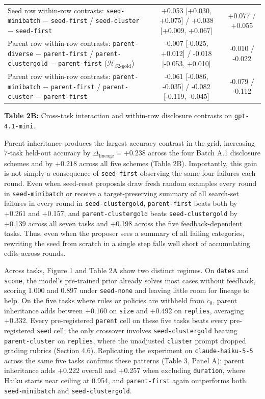 \documentclass[10pt]{article}
\begin{document}
\begin{center}
{\begin{tabular}{@{}>{\raggedright\arraybackslash}p{8.8cm}cc@{}}
Seed row within-row contrasts: \texttt{seed-minibatch} \(-\) \texttt{seed-first} / \texttt{seed-cluster} \(-\) \texttt{seed-first} & +0.053 {[}+0.030, +0.075{]} / +0.038 {[}+0.009, +0.067{]} & +0.077 / +0.055 \\
Parent row within-row contrasts: \texttt{parent-diverse} \(-\) \texttt{parent-first} / \texttt{parent-clustergold} \(-\) \texttt{parent-first} (\(\mathcal{H}_{S2\text{-gold}}\)) & -0.007 {[}-0.025, +0.012{]} / -0.018 {[}-0.053, +0.010{]} & -0.010 / -0.022 \\
Parent row within-row contrasts: \texttt{parent-minibatch} \(-\) \texttt{parent-first} / \texttt{parent-cluster} \(-\) \texttt{parent-first} & -0.061 {[}-0.086, -0.035{]} / -0.082 {[}-0.119, -0.045{]} & -0.079 / -0.112 \\
\bottomrule
\end{tabular}%
}
\end{center}

\textbf{Table 2B:} Cross-task interaction and within-row disclosure
contrasts on \texttt{gpt-4.1-mini}.

Parent inheritance produces the largest accuracy contrast in the grid,
increasing 7-task held-out accuracy by
\(\Delta_{\text{lineage}} = +0.238\) across the four Batch A.1
disclosure schemes and by \(+0.218\) across all five schemes (Table 2B).
Importantly, this gain is not simply a consequence of
\texttt{seed-first} observing the same four failures each round. Even
when seed-reset proposals draw fresh random examples every round in
\texttt{seed-minibatch} or receive a target-preserving summary of all
search-set failures in every round in \texttt{seed-clustergold},
\texttt{parent-first} beats both by +0.261 and +0.157, and
\texttt{parent-clustergold} beats \texttt{seed-clustergold} by +0.139
across all seven tasks and +0.198 across the five feedback-dependent
tasks. Thus, even when the proposer sees a summary of all failing
categories, rewriting the seed from scratch in a single step falls well
short of accumulating edits across rounds.

Across tasks, Figure 1 and Table 2A show two distinct regimes. On
\texttt{dates} and \texttt{scone}, the model's pre-trained prior already
solves most cases without feedback, scoring 1.000 and 0.897 under
\texttt{seed-none} and leaving little room for lineage to help. On the
five tasks where rules or policies are withheld from \(c_0\), parent
inheritance adds between +0.160 on \texttt{size} and +0.492 on
\texttt{replies}, averaging +0.332. Every pre-registered \texttt{parent}
cell on these five tasks beats every pre-registered \texttt{seed} cell;
the only crossover involves \texttt{seed-clustergold} beating
\texttt{parent-cluster} on \texttt{replies}, where the unadjusted
\texttt{cluster} prompt dropped grading rubrics (Section 4.6).
Replicating the experiment on \texttt{claude-haiku-5-5} across the same
five tasks confirms these patterns (Table 3, Panel A): parent
inheritance adds +0.222 overall and +0.257 when excluding
\texttt{duration}, where Haiku starts near ceiling at 0.954, and
\texttt{parent-first} again outperforms both \texttt{seed-minibatch} and
\texttt{seed-clustergold}.
\end{document}
